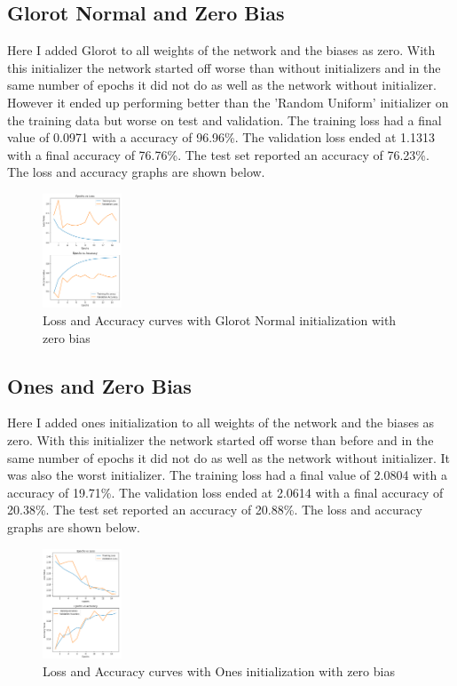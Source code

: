 \documentclass[conference]{IEEEtran}
\begin{document}
    \subsection{Glorot Normal and Zero Bias}

    Here I added Glorot to all weights of the network and the biases as zero. With this initializer
    the network started off worse than without initializers and in the same number of epochs it did not do as well as the network without
    initializer. However it ended up performing better than the 'Random Uniform' initializer on the training data but worse on test and validation.
    The training loss had a final value of 0.0971 with a accuracy of 96.96\%. The validation loss
    ended at 1.1313 with a final accuracy of 76.76\%. The test set reported an accuracy of 76.23\%. The loss and accuracy
    graphs are shown below. 

    \begin{figure}[H]
        \centering
        \captionsetup{justification=centering}
        \centering
            \includegraphics[width=0.21\textwidth]{9.png}
            \caption{Loss and Accuracy curves with Glorot Normal initialization with zero bias}
    \end{figure}

    \subsection{Ones and Zero Bias}

    Here I added ones initialization to all weights of the network and the biases as zero. With this initializer
    the network started off worse than before and in the same number of epochs it did not do as well as the network without
    initializer. It was also the worst initializer. The training loss had a final value of 2.0804 with a accuracy of 19.71\%. The validation loss
    ended at 2.0614 with a final accuracy of 20.38\%. The test set reported an accuracy of 20.88\%. The loss and accuracy
    graphs are shown below.

    \begin{figure}[H]
        \centering
        \captionsetup{justification=centering}
        \centering
            \includegraphics[width=0.21\textwidth]{10.png}
            \caption{Loss and Accuracy curves with Ones initialization with zero bias}
    \end{figure}
\end{document}
